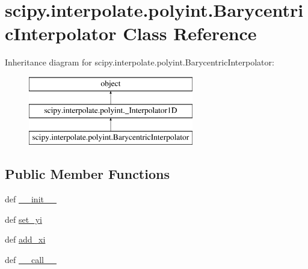 \hypertarget{classscipy_1_1interpolate_1_1polyint_1_1BarycentricInterpolator}{}\section{scipy.\+interpolate.\+polyint.\+Barycentric\+Interpolator Class Reference}
\label{classscipy_1_1interpolate_1_1polyint_1_1BarycentricInterpolator}
Inheritance diagram for scipy.\+interpolate.\+polyint.\+Barycentric\+Interpolator\+:\begin{figure}[H]
\begin{center}
\leavevmode
\includegraphics[height=3.000000cm]{classscipy_1_1interpolate_1_1polyint_1_1BarycentricInterpolator}
\end{center}
\end{figure}
\subsection*{Public Member Functions}
\begin{DoxyCompactItemize}
\item 
def \hyperlink{classscipy_1_1interpolate_1_1polyint_1_1BarycentricInterpolator_a9e2b959032a71d9438f0b5b0dfab8a4e}{\+\_\+\+\_\+init\+\_\+\+\_\+}
\item 
def \hyperlink{classscipy_1_1interpolate_1_1polyint_1_1BarycentricInterpolator_afbcaf5fa7eb1c91377a0b960cfb1d559}{set\+\_\+yi}
\item 
def \hyperlink{classscipy_1_1interpolate_1_1polyint_1_1BarycentricInterpolator_af7d96a9d61a6789248ad114172a263a1}{add\+\_\+xi}
\item 
def \hyperlink{classscipy_1_1interpolate_1_1polyint_1_1BarycentricInterpolator_a85bf658da10ccf8a9a4ce131bf8595af}{\+\_\+\+\_\+call\+\_\+\+\_\+}
\end{DoxyCompactItemize}
